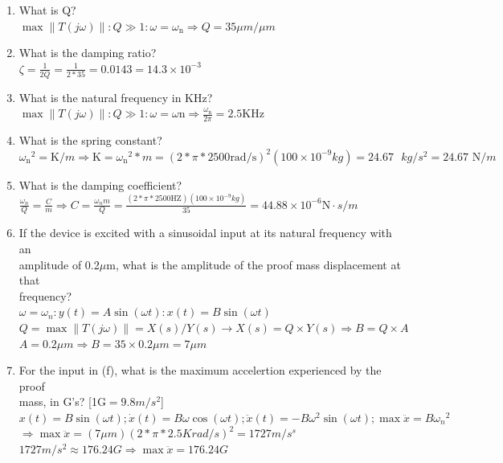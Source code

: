 \documentclass{article}
\begin{document}
\begin{enumerate}
	\item What is Q?\\
		$ \max \| T(j\omega) \| \colon Q \gg 1 \colon \omega = \omega_{\text{n}} 
		\Rightarrow Q = 35 \mu m /\mu m $
	\item What is the damping ratio?\\
		$ \zeta = \frac{1}{2 Q} = \frac{1}{2 * 35} = 0.0143 = 14.3 \times 10^{-3} $
	\item What is the natural frequency in KHz?\\
		$ \max \| T(j\omega) \| \colon Q \gg 1 \colon \omega = \omega{\text{n}}
		\Rightarrow \frac{\omega_{\text{n}}}{2\pi} = 2.5 \text{KHz} $
	\item What is the spring constant?\\
		$ {\omega_{\text{n}}}^2 = \text{K} / m
		\Rightarrow \text{K} = {\omega_{\text{n}}}^2 * m
		= (2*\pi*2500 \text{rad/s})^2 (100 \times 10^{-9} kg) = 24.67\text{ }kg/s^2
		= 24.67\text{ N}/m $
	\item What is the damping coefficient?\\
		$ \frac{\omega_{n}}{Q} = \frac{C}{m} 
		\Rightarrow C = \frac{\omega_n m}{Q} 
		= \frac{(2*\pi*2500 \text{HZ})( 100 \times 10^{-9} kg)}{35}
		= 44.88 \times 10^{-6} \text{N}\cdotp s /m $ 
	\item If the device is excited with a sinusoidal input at its natural frequency with an\\
   	amplitude of 0.2$\mu$m, what is the amplitude of the proof mass displacement at that\\
   	frequency?\\
		$ \omega = \omega_n \colon y(t) = A \sin (\omega t) \colon x(t) = B \sin (\omega t) $\\
		$ Q = \max \| T(j\omega) \| = X(s) / Y(s) \rightarrow X(s) = Q \times Y(s) 
		\Rightarrow B = Q \times A $ \\
		$ A = 0.2\mu m \Rightarrow B = 35 \times 0.2 \mu m = 7 \mu m $
	\item For the input in (f), what is the maximum accelertion experienced by the proof\\
		mass, in G's? [1G$ = 9.8 m/s^2$]\\
		$ x(t) = B \sin (\omega t); \dot{x}(t) = B \omega \cos(\omega t); 
		\ddot{x}(t) = -B \omega^2 \sin(\omega t); \max{\ddot{x}} = B {\omega_n}^2$\\
		$\Rightarrow \max{\ddot{x}} = (7 \mu m )(2*\pi*2.5Krad/s)^2 = 1727  m/s^s$\\
		$ 1727 m/s^2 \approx 176.24 G \Rightarrow \max{\ddot{x}} = 176.24 G$


\end{enumerate}
\end{document}
